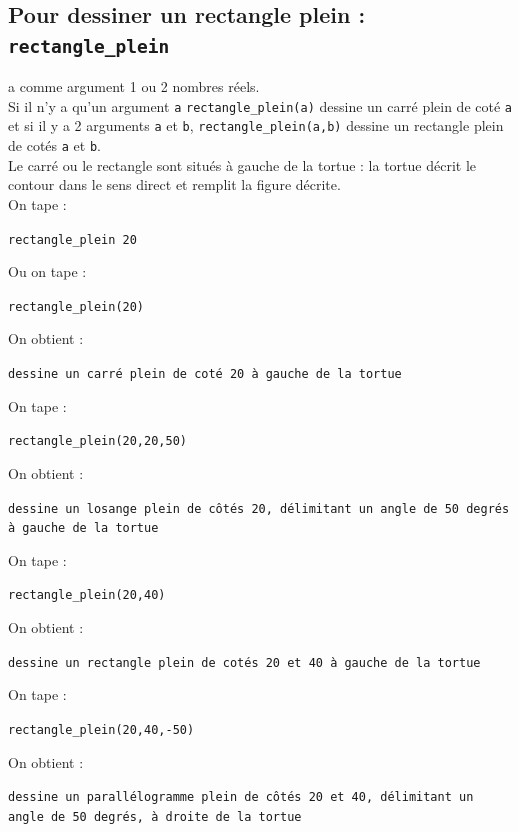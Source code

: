\documentclass[a4paper,11pt]{book}
\begin{document}
\subsection{Pour dessiner un rectangle plein : {\tt rectangle\_plein}}
 a comme argument 1 ou 2 nombres r\'eels.\\
Si il n'y a qu'un argument {\tt a} {\tt rectangle\_plein(a)} dessine un carr\'e
plein de cot\'e {\tt a} et si il y a 2 arguments {\tt a} et {\tt b},
{\tt rectangle\_plein(a,b)} 
dessine un rectangle plein de cot\'es {\tt a} et {\tt b}.\\
Le carr\'e ou le rectangle sont situ\'es \`a gauche de la tortue : la tortue 
d\'ecrit le contour dans le sens direct et remplit la figure d\'ecrite.\\ 
On tape :
\begin{center}{\tt rectangle\_plein 20}\end{center}
Ou on tape :
\begin{center}{\tt rectangle\_plein(20)}\end{center}
On obtient :
\begin{center}{\tt dessine un carr\'e plein de cot\'e 20 \`a gauche de la tortue}\end{center}
On tape :
\begin{center}{\tt rectangle\_plein(20,20,50)}\end{center}
On obtient :
\begin{center}{\tt dessine un losange plein de c\^ot\'es 20, 
d\'elimitant un angle de 50 degr\'es \`a gauche de la tortue}\end{center}
On tape :
\begin{center}{\tt rectangle\_plein(20,40)}\end{center}
On obtient :
\begin{center}{\tt dessine un rectangle plein de cot\'es 20 et 40 \`a gauche de la tortue}\end{center}
On tape :
\begin{center}{\tt rectangle\_plein(20,40,-50)}\end{center}
On obtient :
\begin{center}{\tt dessine un parall\'elogramme plein de c\^ot\'es 20 et 40, d\'elimitant un angle de 50 degr\'es, \`a droite de la tortue}\end{center}
\end{document}
